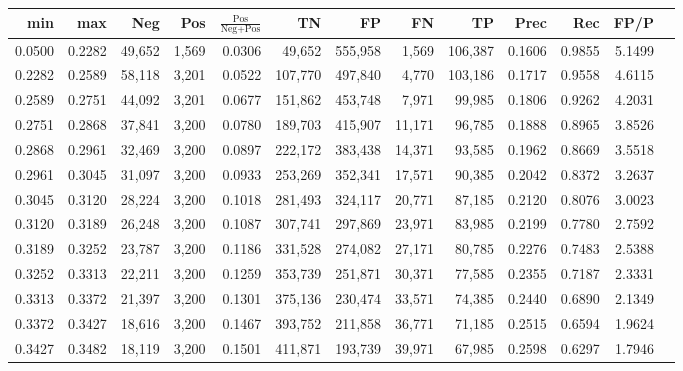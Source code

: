 \begin{tabular}{rrrrrrrrrrrrr}
\toprule
   min &    max &    Neg &   Pos & $\frac{\text{Pos}}{\text{Neg}+\text{Pos}}$ &      TN &      FP &      FN &      TP &   Prec &    Rec &   FP/P \\
\midrule
0.0500 & 0.2282 & 49,652 & 1,569 &                                     0.0306 &  49,652 & 555,958 &   1,569 & 106,387 & 0.1606 & 0.9855 & 5.1499 \\
0.2282 & 0.2589 & 58,118 & 3,201 &                                     0.0522 & 107,770 & 497,840 &   4,770 & 103,186 & 0.1717 & 0.9558 & 4.6115 \\
0.2589 & 0.2751 & 44,092 & 3,201 &                                     0.0677 & 151,862 & 453,748 &   7,971 &  99,985 & 0.1806 & 0.9262 & 4.2031 \\
0.2751 & 0.2868 & 37,841 & 3,200 &                                     0.0780 & 189,703 & 415,907 &  11,171 &  96,785 & 0.1888 & 0.8965 & 3.8526 \\
0.2868 & 0.2961 & 32,469 & 3,200 &                                     0.0897 & 222,172 & 383,438 &  14,371 &  93,585 & 0.1962 & 0.8669 & 3.5518 \\
0.2961 & 0.3045 & 31,097 & 3,200 &                                     0.0933 & 253,269 & 352,341 &  17,571 &  90,385 & 0.2042 & 0.8372 & 3.2637 \\
0.3045 & 0.3120 & 28,224 & 3,200 &                                     0.1018 & 281,493 & 324,117 &  20,771 &  87,185 & 0.2120 & 0.8076 & 3.0023 \\
0.3120 & 0.3189 & 26,248 & 3,200 &                                     0.1087 & 307,741 & 297,869 &  23,971 &  83,985 & 0.2199 & 0.7780 & 2.7592 \\
0.3189 & 0.3252 & 23,787 & 3,200 &                                     0.1186 & 331,528 & 274,082 &  27,171 &  80,785 & 0.2276 & 0.7483 & 2.5388 \\
0.3252 & 0.3313 & 22,211 & 3,200 &                                     0.1259 & 353,739 & 251,871 &  30,371 &  77,585 & 0.2355 & 0.7187 & 2.3331 \\
0.3313 & 0.3372 & 21,397 & 3,200 &                                     0.1301 & 375,136 & 230,474 &  33,571 &  74,385 & 0.2440 & 0.6890 & 2.1349 \\
0.3372 & 0.3427 & 18,616 & 3,200 &                                     0.1467 & 393,752 & 211,858 &  36,771 &  71,185 & 0.2515 & 0.6594 & 1.9624 \\
0.3427 & 0.3482 & 18,119 & 3,200 &                                     0.1501 & 411,871 & 193,739 &  39,971 &  67,985 & 0.2598 & 0.6297 & 1.7946 \\

\end{tabular}
